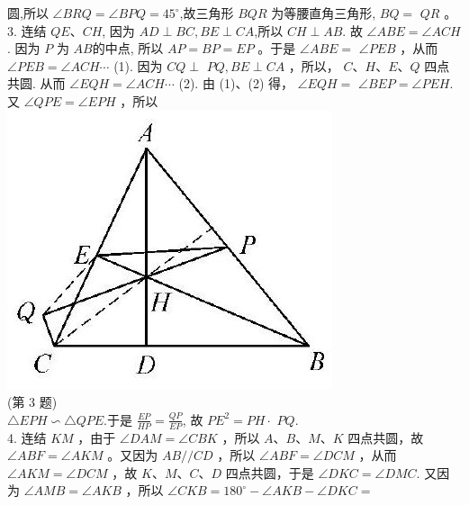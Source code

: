 \documentclass[10pt]{article}
\begin{document}
圆,所以 $\angle B R Q=\angle B P Q=45^{\circ}$,故三角形 $B Q R$ 为等腰直角三角形, $B Q=$ $Q R$ 。\\
3. 连结 $Q E 、 C H$, 因为 $A D \perp B C, B E \perp C A$,所以 $C H \perp A B$. 故 $\angle A B E=\angle A C H$. 因为 $P$ 为 $A B$的中点, 所以 $A P=B P=E P$ 。于是 $\angle A B E=$ $\angle P E B$ ，从而 $\angle P E B=\angle A C H \cdots$ (1). 因为 $C Q \perp$ $P Q, B E \perp C A$ ，所以， $C 、 H 、 E 、 Q$ 四点共圆. 从而 $\angle E Q H=\angle A C H \cdots$ (2). 由 (1)、(2) 得， $\angle E Q H=$ $\angle B E P=\angle P E H$. 又 $\angle Q P E=\angle E P H$ ，所以\\
\includegraphics[max width=\textwidth, center]{2024_10_30_66b8e5e701da2093c133g-096(1)}\\
(第 3 题)\\
$\triangle E P H \backsim \triangle Q P E$.于是 $\frac{E P}{H P}=\frac{Q P}{E P}$, 故 $P E^{2}=P H \cdot$ $P Q$.\\
4. 连结 $K M$ ，由于 $\angle D A M=\angle C B K$ ，所以 $A 、 B 、 M 、 K$ 四点共圆，故 $\angle A B F=\angle A K M$ 。又因为 $A B / / C D$ ，所以 $\angle A B F=\angle D C M$ ，从而 $\angle A K M=\angle D C M$ ，故 $K 、 M 、 C 、 D$ 四点共圆，于是 $\angle D K C=\angle D M C$. 又因为 $\angle A M B=\angle A K B$ ，所以 $\angle C K B=180^{\circ}-\angle A K B-\angle D K C=$\\
\end{document}
